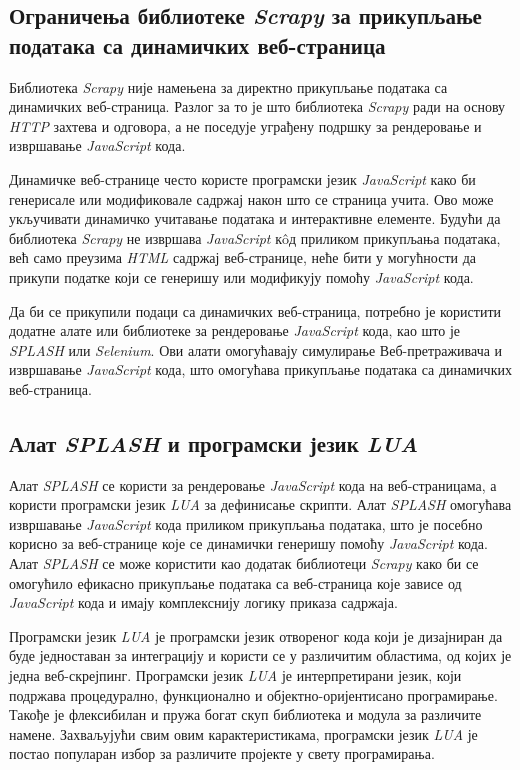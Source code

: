 \documentclass[12pt,oneside]{memoir}
\begin{document}
\subsection{Ограничења библиотеке \textit{Scrapy} за прикупљање података са динамичких веб-страница}
Библиотека \textit{Scrapy} није намењена за директно прикупљање података са динамичких веб-страница. Разлог за то је што библиотека \textit{Scrapy} ради на основу \textit{HTTP} захтева и одговора, а не поседује уграђену подршку за рендеровање и извршавање \textit{JavaScript} кода.

Динамичке веб-странице често користе програмски језик \textit{JavaScript} како би генерисале или модификовале садржај након што се страница учита. Ово може укључивати динамичко учитавање података и интерактивне елементе. Будући да библиотека \textit{Scrapy} не извршава \textit{JavaScript} кôд приликом прикупљања података, већ само преузима \textit{HTML} садржај веб-странице, неће бити у могућности да прикупи податке који се генеришу или модификују помоћу \textit{JavaScript} кода.

Да би се прикупили подаци са динамичких веб-страница, потребно је користити додатне алате или библиотеке за рендеровање \textit{JavaScript} кода, као што је \textit{SPLASH} или \textit{Selenium}. Ови алати омогућавају симулирање Веб-претраживача и извршавање \textit{JavaScript} кода, што омогућава прикупљање података са динамичких веб-страница.

\subsection{Алат \textit{SPLASH} и програмски језик \textit{LUA}}
Алат \textit{SPLASH} се користи за рендеровање \textit{JavaScript} кода на веб-страница\-ма, а користи програмски језик \textit{LUA} за дефинисање скрипти. Алат \textit{SPLASH} омогућава извршавање \textit{JavaScript} кода приликом прикупљања података, што је посебно корисно за веб-странице које се динамички генеришу помоћу \textit{JavaScript} кода. Алат \textit{SPLASH} се може користити као додатак библиотеци \textit{Scrapy} како би се омогућило ефикасно прикупљање података са веб-страница које зависе од \textit{JavaScript} кода и имају комплекснију логику приказа садржаја.

Програмски језик \textit{LUA} \cite{luaDocs} је програмски језик отвореног кода који је дизајниран да буде једноставан за интеграцију и користи се у различитим областима, од којих је једна веб-скрејпинг. Програмски језик \textit{LUA} је интерпретирани језик, који подржава процедурално, функционално и објектно-оријентисано програмирање. Такође је флексибилан и пружа богат скуп библиотека и модула за различите намене. Захваљујући свим овим карактеристикама, програмски језик \textit{LUA} је постао популаран избор за различите пројекте у свету програмирања.
\end{document}
